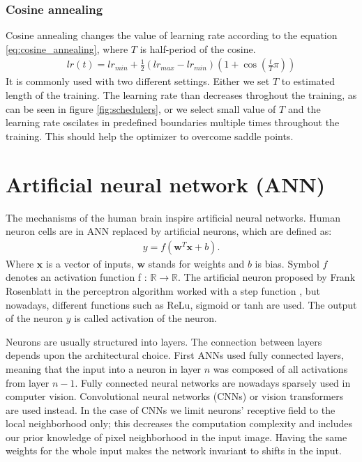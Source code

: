 \subsubsection{Cosine annealing}
Cosine annealing changes the value of learning rate according to the equation \ref{eq:cosine_annealing}, where $T$ is half-period of the cosine.
\begin{align}
    lr(t) = lr_{min} + \frac{1}{2} \left( lr_{max} - lr_{min} \right) \left( 1 + \cos \left( \frac{t}{T}\pi \right) \right)
    \label{eq:cosine_annealing}
\end{align}
It is commonly used with two different settings. Either we set $T$ to estimated length of the training. The learning rate than decreases throghout the training, as can be seen in figure \ref{fig:schedulers}, or we select small value of $T$ and the learning rate oscilates in predefined boundaries multiple times throughout the training. This should help the optimizer to overcome saddle points.

\section{Artificial neural network (ANN)}
The mechanisms of the human brain inspire artificial neural networks. Human neuron cells are in ANN replaced by artificial neurons, which are defined as:
\begin{align}
    y = f \left( \boldsymbol{w}^T \boldsymbol{x}  + b \right).
\end{align}
Where $\boldsymbol{x}$ is a vector of inputs, $\boldsymbol{w}$ stands for weights and $b$ is bias. Symbol $f$ denotes an activation function f : $\mathbb{R} \rightarrow \mathbb{R}$. The artificial neuron proposed by Frank Rosenblatt in the perceptron algorithm worked with a step function \cite{Rosenblatt1958}, but nowadays, different functions such as ReLu, sigmoid or tanh are used. The output of the neuron $y$ is called activation of the neuron.

Neurons are usually structured into layers. The connection between layers depends upon the architectural choice. First ANNs used fully connected layers, meaning that the input into a neuron in layer $n$ was composed of all activations from layer $n-1$. Fully connected neural networks are nowadays sparsely used in computer vision. Convolutional neural networks (CNNs) or vision transformers are used instead. In the case of CNNs we limit neurons' receptive field to the local neighborhood only; this decreases the computation complexity and includes our prior knowledge of pixel neighborhood in the input image. Having the same weights for the whole input makes the network invariant to shifts in the input.

